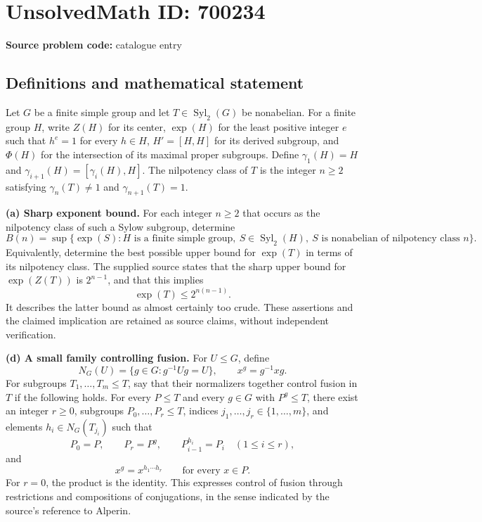 \documentclass[11pt]{article}
\begin{document}
\section*{UnsolvedMath ID: 700234}
\textbf{Source problem code:} catalogue entry
\subsection{Definitions and mathematical statement}
Let \(G\) be a finite simple group and let \(T\in\operatorname{Syl}_2(G)\) be nonabelian. For a finite group \(H\), write \(Z(H)\) for its center, \(\exp(H)\) for the least positive integer \(e\) such that \(h^e=1\) for every \(h\in H\), \(H'=[H,H]\) for its derived subgroup, and \(\Phi(H)\) for the intersection of its maximal proper subgroups. Define \(\gamma_1(H)=H\) and \(\gamma_{i+1}(H)=[\gamma_i(H),H]\). The nilpotency class of \(T\) is the integer \(n\geq 2\) satisfying \(\gamma_n(T)\neq 1\) and \(\gamma_{n+1}(T)=1\).

\textbf{(a) Sharp exponent bound.} For each integer \(n\geq 2\) that occurs as the nilpotency class of such a Sylow subgroup, determine
\[
B(n)=\sup\bigl\{\exp(S): H\text{ is a finite simple group},\ S\in\operatorname{Syl}_2(H),\ S\text{ is nonabelian of nilpotency class }n\bigr\}.
\]
Equivalently, determine the best possible upper bound for \(\exp(T)\) in terms of its nilpotency class. The supplied source states that the sharp upper bound for \(\exp(Z(T))\) is \(2^{n-1}\), and that this implies
\[
\exp(T)\leq 2^{n(n-1)}.
\]
It describes the latter bound as almost certainly too crude. These assertions and the claimed implication are retained as source claims, without independent verification.

\textbf{(d) A small family controlling fusion.} For \(U\leq G\), define
\[
N_G(U)=\{g\in G:g^{-1}Ug=U\},\qquad x^g=g^{-1}xg.
\]
For subgroups \(T_1,\ldots,T_m\leq T\), say that their normalizers together control fusion in \(T\) if the following holds. For every \(P\leq T\) and every \(g\in G\) with \(P^g\leq T\), there exist an integer \(r\geq 0\), subgroups \(P_0,\ldots,P_r\leq T\), indices \(j_1,\ldots,j_r\in\{1,\ldots,m\}\), and elements \(h_i\in N_G(T_{j_i})\) such that
\[
P_0=P,\qquad P_r=P^g,\qquad P_{i-1}^{h_i}=P_i\quad(1\leq i\leq r),
\]
and
\[
x^g=x^{h_1\cdots h_r}\qquad\text{for every }x\in P.
\]
For \(r=0\), the product is the identity. This expresses control of fusion through restrictions and compositions of conjugations, in the sense indicated by the source's reference to Alperin.
\end{document}
